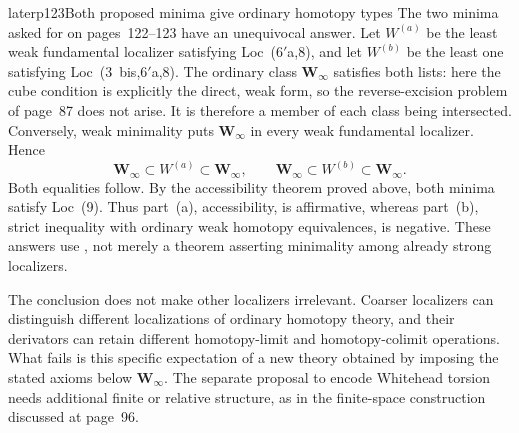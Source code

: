 \begin{dcomment}{later}{p123}{Both proposed minima give ordinary homotopy types}
The two minima asked for on pages~122--123 have an unequivocal answer. Let $W^{(a)}$ be the least weak fundamental localizer satisfying Loc~(6$'$a,8), and let $W^{(b)}$ be the least one satisfying Loc~(3~bis,6$'$a,8). The ordinary class $\mathbf W_\infty$ satisfies both lists: here the cube condition is explicitly the direct, weak form, so the reverse-excision problem of page~87 does not arise. It is therefore a member of each class being intersected. Conversely, weak minimality puts $\mathbf W_\infty$ in every weak fundamental localizer. Hence
\[
 \mathbf W_\infty\subset W^{(a)}\subset\mathbf W_\infty,
 \qquad
 \mathbf W_\infty\subset W^{(b)}\subset\mathbf W_\infty.
\]
Both equalities follow. By the accessibility theorem proved above, both minima satisfy Loc~(9). Thus part~(a), accessibility, is affirmative, whereas part~(b), strict inequality with ordinary weak homotopy equivalences, is negative. These answers use \citet[Theorem~6.1.18]{Cisinski2006}, not merely a theorem asserting minimality among already strong localizers.

The conclusion does not make other localizers irrelevant. Coarser localizers can distinguish different localizations of ordinary homotopy theory, and their derivators can retain different homotopy-limit and homotopy-colimit operations. What fails is this specific expectation of a new theory obtained by imposing the stated axioms below $\mathbf W_\infty$. The separate proposal to encode Whitehead torsion needs additional finite or relative structure, as in the finite-space construction discussed at page~96.
\end{dcomment}

